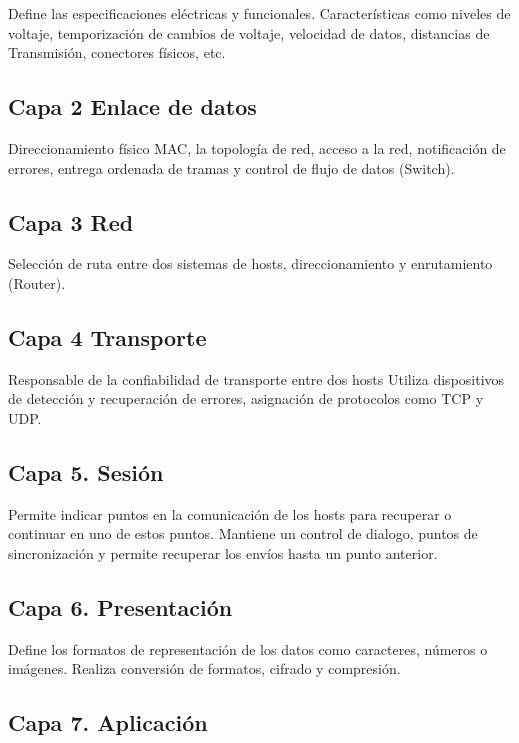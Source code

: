 Define las especificaciones eléctricas y funcionales. Características como niveles de voltaje,
temporización de cambios de voltaje, velocidad de datos, distancias de Transmisión, conectores físicos, etc.\hfill \break

{\raggedright
\subsection{Capa 2 \textbf{Enlace de datos}}
}

Direccionamiento físico MAC, la topología de red, acceso a la red, notificación de errores, entrega ordenada de tramas y control de flujo de datos (Switch).\hfill \break

{\raggedright
\subsection{Capa 3\textbf{ Red}}
}

Selección de ruta entre dos sistemas de hosts, direccionamiento y enrutamiento (Router).\hfill \break

{\raggedright
\subsection{Capa 4 \textbf{Transporte}}
}

Responsable de la confiabilidad de transporte entre dos hosts Utiliza dispositivos de detección y recuperación de errores, asignación de protocolos como TCP y UDP.\hfill \break

{\raggedright
\subsection{Capa 5. \textbf{Sesión}}
}

Permite indicar puntos en la comunicación de los hosts para recuperar o continuar en uno de estos puntos. Mantiene un control de dialogo, puntos de sincronización y permite recuperar los envíos hasta un punto anterior.\hfill \break

{\raggedright
\subsection{Capa 6. \textbf{Presentación}}
}

Define los formatos de representación de los datos como caracteres, números o imágenes. Realiza conversión de formatos, cifrado y compresión.\hfill \break

{\raggedright
\subsection{Capa 7. \textbf{Aplicación}}
}

